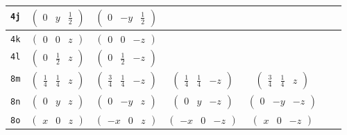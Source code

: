 \documentclass[fleqn,9pt,landscape]{jsarticle}
\begin{document}
\begin{center}
\begin{longtable}{ccccccc}
{\tt 4j} & $ \begin{pmatrix} 0 & y & \frac{1}{2} \end{pmatrix} $ & $ \begin{pmatrix} 0 & - y & \frac{1}{2} \end{pmatrix} $ & $  $ & $  $ & $  $ & $  $ \\ \hline
{\tt 4k} & $ \begin{pmatrix} 0 & 0 & z \end{pmatrix} $ & $ \begin{pmatrix} 0 & 0 & - z \end{pmatrix} $ & $  $ & $  $ & $  $ & $  $ \\ \hline
{\tt 4l} & $ \begin{pmatrix} 0 & \frac{1}{2} & z \end{pmatrix} $ & $ \begin{pmatrix} 0 & \frac{1}{2} & - z \end{pmatrix} $ & $  $ & $  $ & $  $ & $  $ \\ \hline
{\tt 8m} & $ \begin{pmatrix} \frac{1}{4} & \frac{1}{4} & z \end{pmatrix} $ & $ \begin{pmatrix} \frac{3}{4} & \frac{1}{4} & - z \end{pmatrix} $ & $ \begin{pmatrix} \frac{1}{4} & \frac{1}{4} & - z \end{pmatrix} $ & $ \begin{pmatrix} \frac{3}{4} & \frac{1}{4} & z \end{pmatrix} $ & $  $ & $  $ \\ \hline
{\tt 8n} & $ \begin{pmatrix} 0 & y & z \end{pmatrix} $ & $ \begin{pmatrix} 0 & - y & z \end{pmatrix} $ & $ \begin{pmatrix} 0 & y & - z \end{pmatrix} $ & $ \begin{pmatrix} 0 & - y & - z \end{pmatrix} $ & $  $ & $  $ \\ \hline
{\tt 8o} & $ \begin{pmatrix} x & 0 & z \end{pmatrix} $ & $ \begin{pmatrix} - x & 0 & z \end{pmatrix} $ & $ \begin{pmatrix} - x & 0 & - z \end{pmatrix} $ & $ \begin{pmatrix} x & 0 & - z \end{pmatrix} $ & $  $ & $  $ \\ \hline

\end{longtable}
\end{center}
\end{document}
